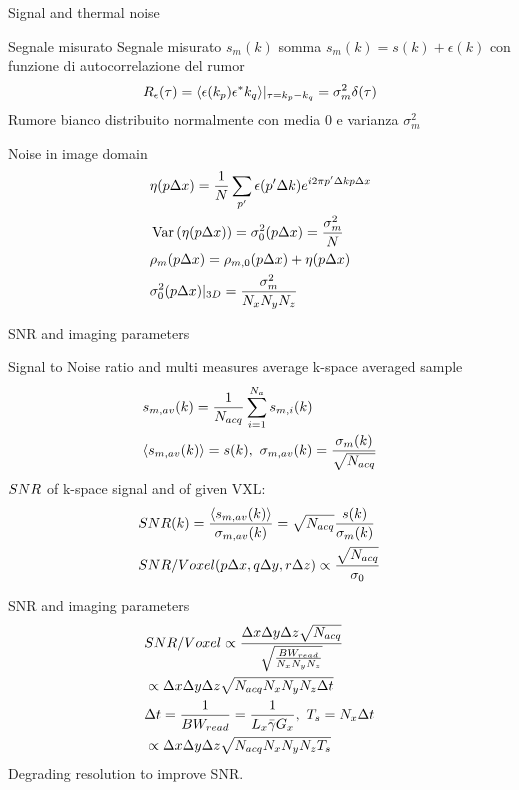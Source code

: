 \begin{frame}[allowframebreaks]{Signal and thermal noise}

\begin{block}{Segnale misurato}
Segnale misurato $s_m(k)$ somma $s_m(k)=s(k)+\epsilon(k)$ con funzione di autocorrelazione del rumor
\begin{equation*}
    R_{\epsilon}(\tau)=\langle \epsilon(k_p)\epsilon^*{k_q} \rangle|_{\tau=k_p-k_q}=\sigma_m^2\delta(\tau)
\end{equation*}
Rumore bianco distribuito normalmente con media 0 e varianza $\sigma_m^2$
\end{block}
\begin{block}{Noise in image domain}
\begin{align*}
&\eta(p\Delta x)=\frac{1}{N}\sum_{p'}\epsilon(p'\Delta k)e^{i2\pi p'\Delta kp\Delta x}\\
&\operatorname{Var}{(\eta(p\Delta x))}=\sigma_0^2(p\Delta x)=\frac{\sigma_m^2}{N}\\
&\rho_m(p\Delta x)=\rho_{m,0}(p\Delta x)+\eta(p\Delta x)\\
&\sigma_0^2(p\Delta x)|_{3D}=\frac{\sigma_m^2}{N_xN_yN_z}
\end{align*}
\end{block}
\end{frame}

\begin{frame}[allowframebreaks]{SNR and imaging parameters}
\begin{block}{Signal to Noise ratio and multi measures average}
k-space averaged sample
\begin{align*}
&s_{m,av}(k)=\frac{1}{N_{acq}}\sum_{i=1}^{N_a}s_{m,i}(k)\\
&\exv{s_{m,av}(k)}=s(k),\ \sigma_{m,av}(k)=\frac{\sigma_m(k)}{\sqrt{N_{acq}}}
\end{align*}
$SNR{}$ of k-space signal and of given VXL:
\begin{align*}
&SNR{(k)}=\frac{\langle s_{m,av}(k) \rangle}{\sigma_{m,av}(k)}=\sqrt{N_{acq}}\frac{s(k)}{\sigma_m(k)}\\
&SNR{}/Voxel{}(p\Delta x, q\Delta y, r\Delta z)\propto\frac{\sqrt{N_{acq}}}{\sigma_0}
\end{align*}
\end{block}
\begin{block}{SNR and imaging parameters}
\begin{align*}
&\SNR{}/\VXL{}\propto\frac{\Delta x\Delta y\Delta z\sqrt{N_{acq}}}{\sqrt{\frac{\BWr{}}{N_xN_yN_z}}}\\
&\propto\Delta x\Delta y\Delta z\sqrt{N_{acq}N_xN_yN_z\Delta t}\\
&\Delta t= \frac{1}{\BW_{read}}=\frac{1}{L_x\gammabar G_x},\ T_s=N_x\Delta t\\
&\propto\Delta x\Delta y\Delta z\sqrt{N_{acq}N_xN_yN_zT_s}
\end{align*}
Degrading resolution to improve SNR.
\end{block}
\end{frame}

